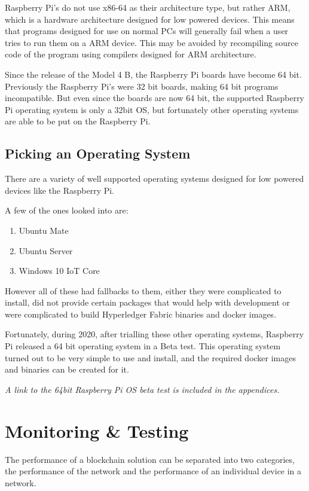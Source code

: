 Raspberry Pi's do not use x86-64 as their architecture type, but rather ARM, which is a hardware architecture designed for low powered devices. This means that programs designed for use on normal PCs will generally fail when a user tries to run them on a ARM device. This may be avoided by recompiling source code of the program using compilers designed for ARM architecture.

Since the release of the Model 4 B, the Raspberry Pi boards have become 64 bit. Previously the Raspberry Pi's were 32 bit boards, making 64 bit programs incompatible. But even since the boards are now 64 bit, the supported Raspberry Pi operating system is only a 32bit OS, but fortunately other operating systems are able to be put on the Raspberry Pi.

\subsection{Picking an Operating System}

There are a variety of well supported operating systems designed for low powered devices like the Raspberry Pi. 

A few of the ones looked into are:
\begin{enumerate}
\item Ubuntu Mate
\item Ubuntu Server
\item Windows 10 IoT Core
\end{enumerate}

However all of these had fallbacks to them, either they were complicated to install, did not provide certain packages that would help with development or were complicated to build Hyperledger Fabric binaries and docker images.

Fortunately, during 2020, after trialling these other operating systems, Raspberry Pi released a 64 bit operating system in a Beta test. This operating system turned out to be very simple to use and install, and the required docker images and binaries can be created for it.

\textit{A link to the 64bit Raspberry Pi OS beta test is included in the appendices.}

\section{Monitoring \& Testing}

The performance of a blockchain solution can be separated into two categories, the performance of the network and the performance of an individual device in a network. 

